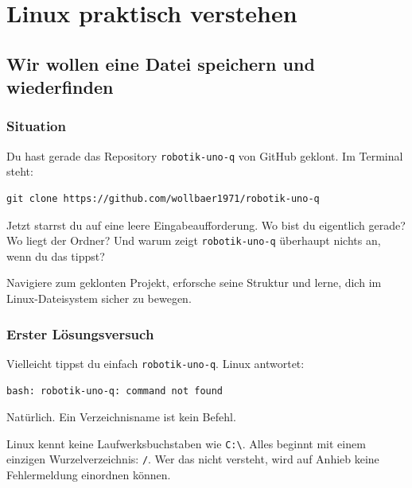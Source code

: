 \part{Linux praktisch verstehen}

\chapter{Wir wollen eine Datei speichern und wiederfinden}

\kapitelstruktur

\section{Situation}

Du hast gerade das Repository \texttt{robotik-uno-q} von GitHub
geklont. Im Terminal steht:

\begin{lstlisting}[style=bash]
git clone https://github.com/wollbaer1971/robotik-uno-q
\end{lstlisting}

Jetzt starrst du auf eine leere Eingabeaufforderung.
Wo bist du eigentlich gerade? Wo liegt der Ordner?
Und warum zeigt \texttt{robotik-uno-q} überhaupt nichts an,
wenn du das tippst?

\begin{aufgabeBox}
Navigiere zum geklonten Projekt, erforsche seine Struktur
und lerne, dich im Linux-Dateisystem sicher zu bewegen.
\end{aufgabeBox}

\section{Erster Lösungsversuch}

Vielleicht tippst du einfach \texttt{robotik-uno-q}.
Linux antwortet:
\begin{lstlisting}[style=text]
bash: robotik-uno-q: command not found
\end{lstlisting}

Natürlich. Ein Verzeichnisname ist kein Befehl.

\begin{problemBox}
Linux kennt keine Laufwerksbuchstaben wie \texttt{C:\textbackslash}.
Alles beginnt mit einem einzigen Wurzelverzeichnis: \texttt{/}.
Wer das nicht versteht, wird auf Anhieb keine Fehlermeldung
einordnen können.
\end{problemBox}

